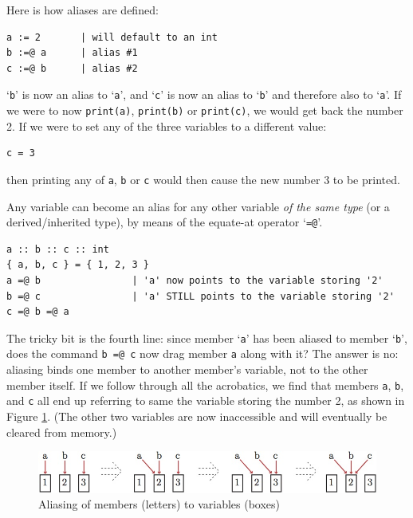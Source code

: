 \documentclass{article}
\newenvironment{code}{
       \begin{list}{}{
               \setlength{\leftmargin}{.4in}
               \setlength{\rightmargin}{0in}
               \setlength{\topsep}{.2in}
       }
       \small
       \item[] }
       { \end{list}   }
\begin{document}
Here is how aliases are defined:

\begin{code} \begin{verbatim}
a := 2       | will default to an int
b :=@ a      | alias #1
c :=@ b      | alias #2
\end{verbatim} \end{code}

\noindent `\verb#b#' is now an alias to `\verb#a#', and `\verb#c#' is now an alias to `\verb#b#' and therefore also to `\verb#a#'.  If we were to now \texttt{print(a)}, \texttt{print(b)} or \texttt{print(c)}, we would get back the number 2.  If we were to set any of the three variables to a different value:

\begin{code} \begin{verbatim}
c = 3
\end{verbatim} \end{code}

\noindent then printing any of \texttt{a}, \texttt{b} or \texttt{c} would then cause the new number 3 to be printed.

Any variable can become an alias for any other variable \emph{of the same type} (or a derived/inherited type), by means of the equate-at operator `\texttt{=@}'.

\begin{code} \begin{verbatim}
a :: b :: c :: int
{ a, b, c } = { 1, 2, 3 }
a =@ b                | 'a' now points to the variable storing '2'
b =@ c                | 'a' STILL points to the variable storing '2'
c =@ b =@ a
\end{verbatim} \end{code}

\noindent The tricky bit is the fourth line:  since member `\verb#a#' has been aliased to member `\verb#b#', does the command \verb#b =@ c# now drag member \verb#a# along with it?  The answer is no:  aliasing binds one member to another member's variable, not to the other member itself.  If we follow through all the acrobatics, we find that members \verb#a#, \verb#b#, and \verb#c# all end up referring to same the variable storing the number 2, as shown in Figure \ref{aliases}.  (The other two variables are now inaccessible and will eventually be cleared from memory.)

\begin{figure}
\centering
\includegraphics[width=\textwidth]{aliases}
\caption{Aliasing of members (letters) to variables (boxes)}
\label{aliases}
\end{figure}
\end{document}
